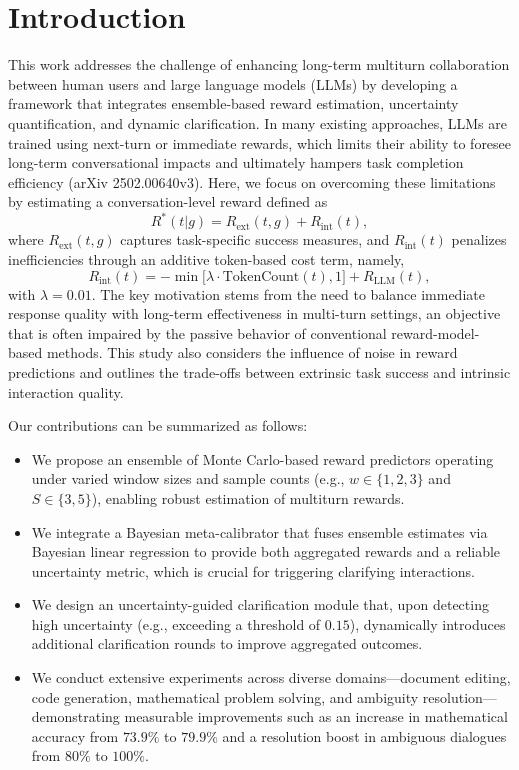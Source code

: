 \documentclass{article}
\begin{document}
\section{Introduction}
This work addresses the challenge of enhancing long-term multiturn collaboration between human users and large language models (LLMs) by developing a framework that integrates ensemble-based reward estimation, uncertainty quantification, and dynamic clarification. In many existing approaches, LLMs are trained using next-turn or immediate rewards, which limits their ability to foresee long-term conversational impacts and ultimately hampers task completion efficiency (arXiv 2502.00640v3). Here, we focus on overcoming these limitations by estimating a conversation-level reward defined as 
\[
R^*(t|g) = R_{\text{ext}}(t,g) + R_{\text{int}}(t),
\]
where \(R_{\text{ext}}(t,g)\) captures task-specific success measures, and \(R_{\text{int}}(t)\) penalizes inefficiencies through an additive token-based cost term, namely, 
\[
R_{\text{int}}(t) = -\min\bigl[\lambda \cdot \text{TokenCount}(t), 1\bigr] + R_{\text{LLM}}(t),
\]
with \(\lambda = 0.01\). The key motivation stems from the need to balance immediate response quality with long-term effectiveness in multi-turn settings, an objective that is often impaired by the passive behavior of conventional reward-model-based methods. This study also considers the influence of noise in reward predictions and outlines the trade-offs between extrinsic task success and intrinsic interaction quality.

Our contributions can be summarized as follows:
\begin{itemize}
    \item We propose an ensemble of Monte Carlo-based reward predictors operating under varied window sizes and sample counts (e.g., \(w \in \{1,2,3\}\) and \(S \in \{3,5\}\)), enabling robust estimation of multiturn rewards.
    \item We integrate a Bayesian meta-calibrator that fuses ensemble estimates via Bayesian linear regression to provide both aggregated rewards and a reliable uncertainty metric, which is crucial for triggering clarifying interactions.
    \item We design an uncertainty-guided clarification module that, upon detecting high uncertainty (e.g., exceeding a threshold of \(0.15\)), dynamically introduces additional clarification rounds to improve aggregated outcomes.
    \item We conduct extensive experiments across diverse domains—document editing, code generation, mathematical problem solving, and ambiguity resolution—demonstrating measurable improvements such as an increase in mathematical accuracy from \(73.9\%\) to \(79.9\%\) and a resolution boost in ambiguous dialogues from \(80\%\) to \(100\%\).
\end{itemize}
\end{document}
